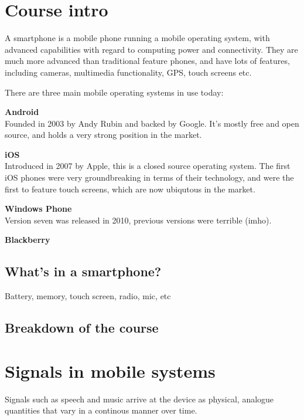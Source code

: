 
\section{Course intro}

A smartphone is a mobile phone running a mobile operating system, with advanced
capabilities with regard to computing power and connectivity. They are much more
advanced than traditional feature phones, and have lots of features, including
cameras, multimedia functionality, GPS, touch screens etc.

There are three main mobile operating systems in use today:

\begin{description}

  \item \textbf{Android}\\
  	Founded in 2003 by Andy Rubin and backed by Google. It's mostly free and
  	open source, and holds a very strong position in the market.
  \item \textbf{iOS}\\
  	Introduced in 2007 by Apple, this is a closed source operating system. The
  	first iOS phones were very groundbreaking in terms of their technology, and
  	were the first to feature touch screens, which are now ubiqutous in the
  	market.
  \item \textbf{Windows Phone}\\
    Version seven was released in 2010, previous versions were terrible (imho).
  \item \textbf{Blackberry}\\
\end{description}

\subsection{What's in a smartphone?}

Battery, memory, touch screen, radio, mic, etc

\subsection{Breakdown of the course}



\section{Signals in mobile systems}

Signals such as speech and music arrive at the device as physical, analogue quantities that vary in a continous manner over time.

